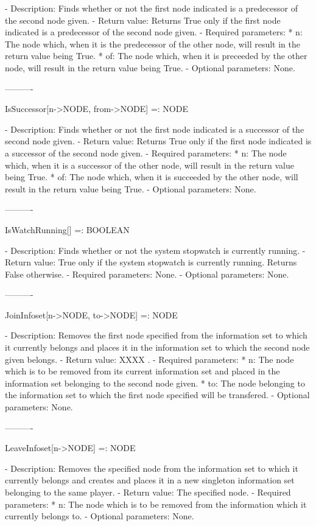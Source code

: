    -	Description:  Finds whether or not the first node indicated is a 
	predecessor of the second node given.
   -	Return value:  Returns True only if the first node indicated is a
	predecessor of the second node given.
   -	Required parameters:
	  *  n:  The node which, when it is the predecessor of the other node,
		will result in the return value being True.
	  *  of:  The node which, when it is preceeded by the other node, will
		result in the return value being True.
   -	Optional parameters:  None.

----------

IsSuccessor[n->NODE, from->NODE] =: NODE

   -	Description:  Finds whether or not the first node indicated is a 
	successor of the second node given.
   -	Return value:  Returns True only if the first node indicated is a
	successor of the second node given.
   -	Required parameters:
	  *  n:  The node which, when it is a successor of the other node, will
		result in the return value being True.
	  *  of:  The node which, when it is succeeded by the other node, will
		result in the return value being True.
   -	Optional parameters:  None.

----------

IsWatchRunning[] =: BOOLEAN

   -	Description:  Finds whether or not the system stopwatch is currently
	running.
   -	Return value:  True only if the system stopwatch is currently running.
	Returns False otherwise.
   -	Required parameters:  None.
   -	Optional parameters:  None.

----------

JoinInfoset[n->NODE, to->NODE] =: NODE

   -	Description:  Removes the first node specified from the information set
	to which it currently belongs and places it in the information set to
	which the second node given belongs.
   -	Return value:  XXXX .
   -	Required parameters:
	  *  n:  The node which is to be removed from its current information
		set and placed in the information set belonging to the second
		node given.
	  *  to:  The node belonging to the information set to which the first
		node specified will be transfered.
   -	Optional parameters:  None.

----------

LeaveInfoset[n->NODE] =: NODE

   -	Description:  Removes the specified node from the information set to
	which it currently belongs and creates and places it in a new singleton
	information set belonging to the same player.
   -	Return value:  The specified node.
   -	Required parameters:
	  *  n:  The node which is to be removed from the information which it
		currently belongs to.
   -	Optional parameters:  None.

